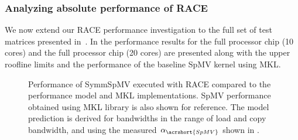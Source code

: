 \subsubsection{Analyzing absolute performance of RACE}
%
We now extend our \acrshort{RACE}  performance investigation to the full set of test matrices presented in~. In  the performance results for the full \IVB processor chip (10 cores) and the full \SKX processor chip (20 cores) are presented along with the upper roofline limits and the performance of the baseline \acrshort{SpMV} kernel using \acrshort{MKL}.  
 \begin{figure}[t]
	\centering
	\hspace{1em}
	\caption{Performance of \acrshort{SymmSpMV} executed with \acrshort{RACE} compared to the performance model and \acrshort{MKL} implementations. \acrshort{SpMV} performance obtained using \acrshort{MKL} library is also shown for reference. The model prediction is derived for  bandwidths in the range of load and copy bandwidth, and using the measured $\alpha_{\acrshort{SpMV}}$ shown in .}
	\label{fig:SpMV_vs_SymmSpMV}
\end{figure}
